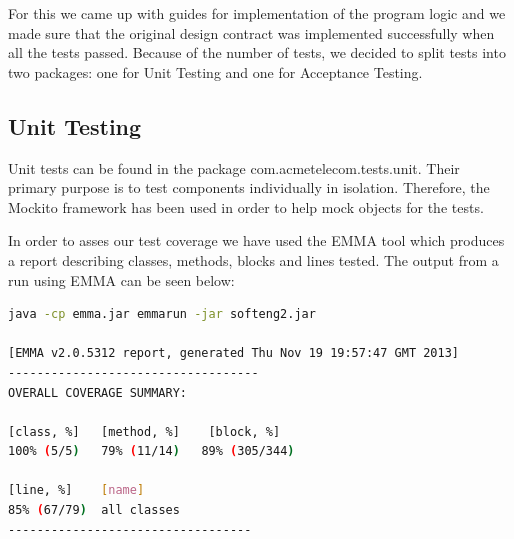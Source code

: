 \documentclass[11pt,twocolumn]{article} %
\begin{document}
For this we came up with guides for implementation of the program logic and we made sure that the original design contract 
was implemented successfully when all the tests passed.            
Because of the number of tests, we decided to split tests into two packages: one for Unit Testing and one for Acceptance Testing.


\subsection{Unit Testing}
Unit tests can be found in the package com.acmetelecom.tests.unit. Their primary purpose is to test components individually in isolation. 
Therefore, the Mockito\cite{mockito} framework has been used in order to help mock objects for the tests.

In order to asses our test coverage we have used the EMMA tool which produces a report describing classes, methods, blocks and lines tested. 
The output from a run using EMMA can be seen below:

\begin{lstlisting}[language=bash]
java -cp emma.jar emmarun -jar softeng2.jar

[EMMA v2.0.5312 report, generated Thu Nov 19 19:57:47 GMT 2013]
-----------------------------------
OVERALL COVERAGE SUMMARY:

[class, %]   [method, %]    [block, %]   
100% (5/5)   79% (11/14)   89% (305/344) 

[line, %]    [name]
85% (67/79)  all classes
----------------------------------
\end{lstlisting}
\end{document}
